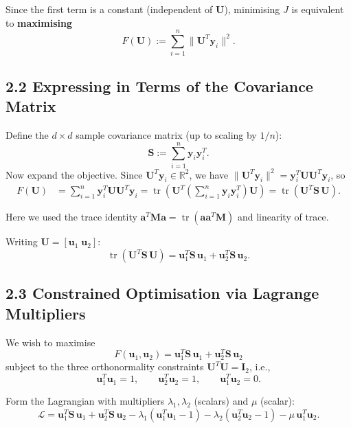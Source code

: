 \documentclass[11pt]{article}
\begin{document}
Since the first term is a constant (independent of $\boldsymbol{U}$), minimising $J$ is
equivalent to \textbf{maximising}
\[
F(\boldsymbol{U}) := \sum_{i=1}^n \|\boldsymbol{U}^T\boldsymbol{y}_i\|^2.
\]

\subsection*{2.2 Expressing in Terms of the Covariance Matrix}

Define the $d \times d$ sample covariance matrix (up to scaling by $1/n$):
\[
\boldsymbol{S} := \sum_{i=1}^n \boldsymbol{y}_i\boldsymbol{y}_i^T.
\]
Now expand the objective. Since $\boldsymbol{U}^T\boldsymbol{y}_i \in \mathbb{R}^2$, we have
$\|\boldsymbol{U}^T\boldsymbol{y}_i\|^2 = \boldsymbol{y}_i^T\boldsymbol{U}\boldsymbol{U}^T\boldsymbol{y}_i$, so
\begin{align}
F(\boldsymbol{U})
&= \sum_{i=1}^n \boldsymbol{y}_i^T\boldsymbol{U}\boldsymbol{U}^T\boldsymbol{y}_i
= \operatorname{tr}\!\left(\boldsymbol{U}^T\!\left(\sum_{i=1}^n\boldsymbol{y}_i\boldsymbol{y}_i^T\right)\!\boldsymbol{U}\right)
= \operatorname{tr}(\boldsymbol{U}^T \boldsymbol{S}\,\boldsymbol{U}).
\end{align}

Here we used the trace identity $\boldsymbol{a}^T\boldsymbol{M}\boldsymbol{a} = \operatorname{tr}(\boldsymbol{a}\boldsymbol{a}^T\boldsymbol{M})$
and linearity of trace.

Writing $\boldsymbol{U} = [\boldsymbol{u}_1\;\boldsymbol{u}_2]$:
\[
\operatorname{tr}(\boldsymbol{U}^T\boldsymbol{S}\,\boldsymbol{U})
= \boldsymbol{u}_1^T\boldsymbol{S}\,\boldsymbol{u}_1
+ \boldsymbol{u}_2^T\boldsymbol{S}\,\boldsymbol{u}_2.
\]

\subsection*{2.3 Constrained Optimisation via Lagrange Multipliers}

We wish to maximise
\[
F(\boldsymbol{u}_1,\boldsymbol{u}_2)
= \boldsymbol{u}_1^T\boldsymbol{S}\,\boldsymbol{u}_1
+ \boldsymbol{u}_2^T\boldsymbol{S}\,\boldsymbol{u}_2
\]
subject to the three orthonormality constraints
$\boldsymbol{U}^T\boldsymbol{U} = \boldsymbol{I}_2$, i.e.,
\[
\boldsymbol{u}_1^T\boldsymbol{u}_1 = 1,\qquad
\boldsymbol{u}_2^T\boldsymbol{u}_2 = 1,\qquad
\boldsymbol{u}_1^T\boldsymbol{u}_2 = 0.
\]

Form the Lagrangian with multipliers $\lambda_1, \lambda_2$ (scalars) and $\mu$ (scalar):
\[
\mathcal{L} = \boldsymbol{u}_1^T\boldsymbol{S}\,\boldsymbol{u}_1
+ \boldsymbol{u}_2^T\boldsymbol{S}\,\boldsymbol{u}_2
- \lambda_1(\boldsymbol{u}_1^T\boldsymbol{u}_1 - 1)
- \lambda_2(\boldsymbol{u}_2^T\boldsymbol{u}_2 - 1)
- \mu\,\boldsymbol{u}_1^T\boldsymbol{u}_2.
\]
\end{document}
